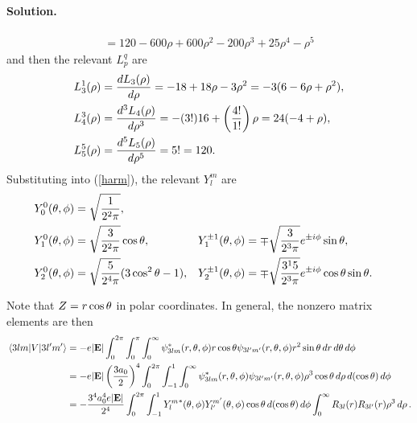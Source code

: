 \documentclass[11pt]{article}
\newcommand{\refeq}[1]{(\ref{#1})}
\newenvironment{solution}
{
    \paragraph{Solution.}
    \ignorespaces
}
{
}
\begin{document}
\begin{solution}
\begin{align*}
		= 120 - 600 \rho + 600 \rho^2 - 200 \rho^3 + 25 \rho^4 - \rho^5
	\end{align*}
	and then the relevant $L_p^q$ are
	\begin{align*}
		L_3^1(\rho) &= \dv{L_3(\rho)}{\rho} 
		= -18 + 18 \rho - 3 \rho^2
		= -3 (6 - 6 \rho + \rho^2), \\
		L_4^3(\rho) &= \dv[3]{L_4(\rho)}{\rho}
		= -(3!) 16 + \left( \frac{4!}{1!} \right) \rho
		= 24 (-4 + \rho), \\
		L_5^5(\rho) &= \dv[5]{L_5(\rho)}{\rho}
		= 5!
		= 120.
	\end{align*}
	\clearpage
	Substituting into \refeq{harm}, the relevant $Y_l^m$ are
	\begin{align*}
		Y_0^0(\theta, \phi) &= \sqrt{\frac{1}{2^2 \pi}}, \\
		Y_1^0(\theta, \phi) &= \sqrt{\frac{3}{2^2 \pi}} \cos\theta, &
		Y_1^{\pm 1}(\theta, \phi) &= \mp \sqrt{\frac{3}{2^3 \pi}} e^{\pm i \phi} \sin\theta, \\
		Y_2^0(\theta, \phi) &= \sqrt{\frac{5}{2^4 \pi}} (3 \cos^2\theta - 1), &
		Y_2^{\pm1}(\theta, \phi) &= \mp \sqrt{\frac{3^1 5}{2^3 \pi}} e^{\pm i \phi} \cos\theta \sin\theta.
	\end{align*}
	
	Note that $Z = r \cos\theta$ in polar coordinates.  In general, the nonzero matrix elements are then
	\begin{align*}
		\mel{3 l m}{V}{3 l' m'} &= -e |\mathbf{E}| \int_0^{2\pi} \int_0^\pi \int_0^\infty \psi_{3 l m}^*(r, \theta, \phi) r \cos\theta \psi_{3 l' m'}(r, \theta, \phi) r^2 \sin\theta \dd{r} \dd{\theta} \dd{\phi} \\
		&= -e |\mathbf{E}| \left( \frac{3 a_0}{2} \right)^4 \int_0^{2\pi} \int_{-1}^1 \int_0^\infty \psi_{3 l m}^*(r, \theta, \phi) \psi_{3 l' m'}(r, \theta, \phi) \rho^3 \cos\theta \dd{\rho} \dd{(\cos\theta)} \dd{\phi} \\
		&= -\frac{3^4 a_0^4 e |\mathbf{E}|}{2^4} \int_0^{2\pi} \int_{-1}^1 {Y_l^m}^*(\theta, \phi) Y_{l'}^{m'}(\theta, \phi) \cos\theta \dd{(\cos\theta)} \dd{\phi} \int_0^\infty R_{3 l}(r) R_{3 l'}(r) \rho^3 \dd{\rho}.
	\end{align*}
	

\end{solution}
\end{document}
